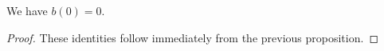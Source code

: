 \begin{proposition}\label{prop:b0}\leanok
We have $b(0) = 0$.
\end{proposition}
\begin{proof}\leanok
These identities follow immediately from the previous proposition.
\end{proof}

